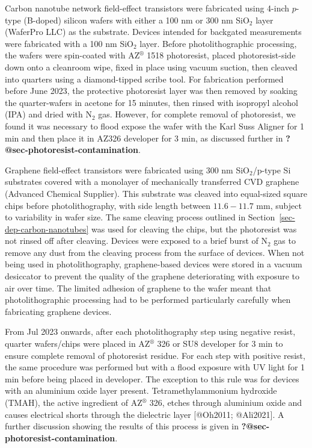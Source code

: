 \documentclass[
  letterpaper,
  DIV=11,
  numbers=noendperiod]{scrartcl}
\begin{document}
Carbon nanotube network field-effect transistors were fabricated using
4-inch \(p\)-type (B-doped) silicon wafers with either a 100 nm or 300
nm SiO\(_2\) layer (WaferPro LLC) as the substrate. Devices intended for
backgated measurements were fabricated with a 100 nm SiO\(_2\) layer.
Before photolithographic processing, the wafers were spin-coated with
AZ\(^\circledR\) 1518 photoresist, placed photoresist-side down onto a
cleanroom wipe, fixed in place using vacuum suction, then cleaved into
quarters using a diamond-tipped scribe tool. For fabrication performed
before June 2023, the protective photoresist layer was then removed by
soaking the quarter-wafers in acetone for 15 minutes, then rinsed with
isopropyl alcohol (IPA) and dried with N\(_2\) gas. However, for
complete removal of photoresist, we found it was necessary to flood
expose the wafer with the Karl Suss Aligner for 1 min and then place it
in AZ326 developer for 3 min, as discussed further in
\textbf{?@sec-photoresist-contamination}.

Graphene field-effect transistors were fabricated using 300 nm
SiO\(_2\)/p-type Si substrates covered with a monolayer of mechanically
transferred CVD graphene (Advanced Chemical Supplier). This substrate
was cleaved into equal-sized square chips before photolithography, with
side length between \(11.6-11.7\) mm, subject to variability in wafer
size. The same cleaving process outlined in
Section~\ref{sec-dep-carbon-nanotubes} was used for cleaving the chips,
but the photoresist was not rinsed off after cleaving. Devices were
exposed to a brief burst of N\(_2\) gas to remove any dust from the
cleaving process from the surface of devices. When not being used in
photolithography, graphene-based devices were stored in a vacuum
desiccator to prevent the quality of the graphene deteriorating with
exposure to air over time. The limited adhesion of graphene to the wafer
meant that photolithographic processing had to be performed particularly
carefully when fabricating graphene devices.

From Jul 2023 onwards, after each photolithography step using negative
resist, quarter wafers/chips were placed in AZ\(^\circledR\) 326 or SU8
developer for 3 min to ensure complete removal of photoresist residue.
For each step with positive resist, the same procedure was performed but
with a flood exposure with UV light for 1 min before being placed in
developer. The exception to this rule was for devices with an aluminium
oxide layer present. Tetramethylammonium hydroxide (TMAH), the active
ingredient of AZ\(^\circledR\) 326, etches through aluminium oxide and
causes electrical shorts through the dielectric layer {[}@Oh2011;
@Ali2021{]}. A further discussion showing the results of this process is
given in \textbf{?@sec-photoresist-contamination}.
\end{document}
